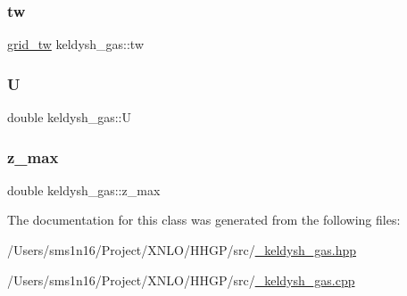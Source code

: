 \mbox{\label{classkeldysh__gas_a1cd7129f9ba9d62f4084049e529cab49}} 
\subsubsection{\texorpdfstring{tw}{tw}}
{\footnotesize\ttfamily \hyperlink{classgrid__tw}{grid\+\_\+tw} keldysh\+\_\+gas\+::tw\hspace{0.3cm}{\ttfamily [private]}}

\mbox{\label{classkeldysh__gas_a752b70afe289a798cc0ab7b688b9ed3d}} 
\subsubsection{\texorpdfstring{U}{U}}
{\footnotesize\ttfamily double keldysh\+\_\+gas\+::U}

\mbox{\label{classkeldysh__gas_a117691dd8b6fd06b34a73392c0e73e32}} 
\subsubsection{\texorpdfstring{z\+\_\+max}{z\_max}}
{\footnotesize\ttfamily double keldysh\+\_\+gas\+::z\+\_\+max}



The documentation for this class was generated from the following files\+:\begin{DoxyCompactItemize}
\item 
/\+Users/sms1n16/\+Project/\+X\+N\+L\+O/\+H\+H\+G\+P/src/\hyperlink{__keldysh__gas_8hpp}{\+\_\+keldysh\+\_\+gas.\+hpp}\item 
/\+Users/sms1n16/\+Project/\+X\+N\+L\+O/\+H\+H\+G\+P/src/\hyperlink{__keldysh__gas_8cpp}{\+\_\+keldysh\+\_\+gas.\+cpp}\end{DoxyCompactItemize}
